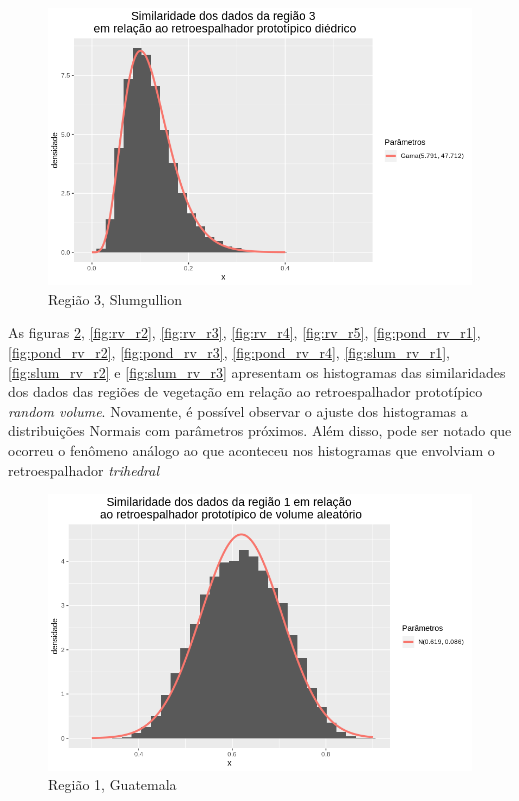 \documentclass[12pt]{article}
\begin{document}
\begin{figure}[!h]
    \centering
    \vspace{0.1\linewidth}
    \includegraphics[width = \linewidth]{../../Images/Report_18_12_20/slum_di_region3.png}
    \caption{Região 3, Slumgullion}
    \label{fig:slum_di_r3}
\end{figure}

As figuras \ref{fig:rv_r1}, \ref{fig:rv_r2}, \ref{fig:rv_r3}, \ref{fig:rv_r4}, \ref{fig:rv_r5}, \ref{fig:pond_rv_r1}, \ref{fig:pond_rv_r2}, \ref{fig:pond_rv_r3}, \ref{fig:pond_rv_r4}, \ref{fig:slum_rv_r1}, \ref{fig:slum_rv_r2} e \ref{fig:slum_rv_r3} apresentam os histogramas das similaridades dos dados das regiões de vegetação em relação ao retroespalhador prototípico \textit{random volume}. Novamente, é possível observar o ajuste dos histogramas a distribuições Normais com parâmetros próximos. Além disso, pode ser notado que ocorreu o fenômeno análogo ao que aconteceu nos histogramas que envolviam o retroespalhador \textit{trihedral}

\begin{figure}[!h]
    \centering
    \includegraphics[width = 0.95\linewidth]{../../Images/Report_18_12_17/rv_region1.png}
    \caption{Região 1, Guatemala}
    \label{fig:rv_r1}
\end{figure}
\end{document}
